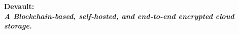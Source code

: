 {
  \huge
  \bfseries
  Devault: \\
  \mdseries
  \itshape
  \Large
  A Blockchain-based, self-hosted, and end-to-end encrypted cloud storage.
  \par
}